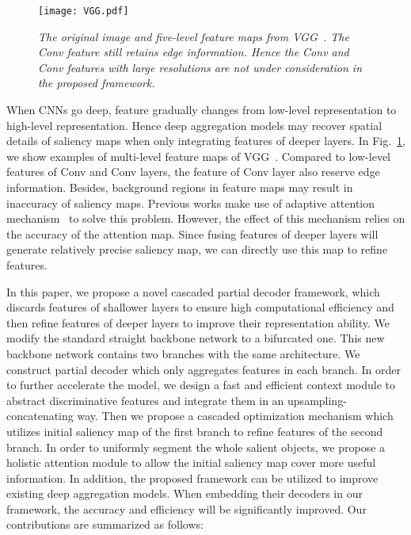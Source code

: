 \documentclass[10pt,twocolumn,letterpaper]{article}
\begin{document}
\begin{figure}
  \centering
  \texttt{[image: VGG.pdf]}\\
  \caption{\emph{The original image and five-level feature maps from VGG~\cite{2014VGG}. The Conv feature still retains edge information. Hence the Conv and Conv features with large resolutions are not under consideration in the proposed framework.}}
  \label{VGGFeatures}
\end{figure}

When CNNs go deep, feature gradually changes from low-level representation to high-level representation. Hence deep aggregation models may recover spatial details of saliency maps when only integrating features of deeper layers. In Fig.~\ref{VGGFeatures}, we show examples of multi-level feature maps of VGG~\cite{2014VGG}. Compared to low-level features of Conv and Conv layers, the feature of Conv layer also reserve edge information. Besides, background regions in feature maps may result in inaccuracy of saliency maps. Previous works make use of adaptive attention mechanism~\cite{2018PiCANet,2018BMPM} to solve this problem. However, the effect of this mechanism relies on the accuracy of the attention map. Since fusing features of deeper layers will generate relatively precise saliency map, we can directly use this map to refine features.

In this paper, we propose a novel cascaded partial decoder framework, which discards features of shallower layers to ensure high computational efficiency and then refine features of deeper layers to improve their representation ability. We modify the standard straight backbone network to a bifurcated one. This new backbone network contains two branches with the same architecture. We construct partial decoder which only aggregates features in each branch. In order to further accelerate the model, we design a fast and efficient context module to abstract discriminative features and integrate them in an upsampling-concatenating way. Then we propose a cascaded optimization mechanism which utilizes initial saliency map of the first branch to refine features of the second branch. In order to uniformly segment the whole salient objects, we propose a holistic attention module to allow the initial saliency map cover more useful information. In addition, the proposed framework can be utilized to improve existing deep aggregation models. When embedding their decoders in our framework, the accuracy and efficiency will be significantly improved. Our contributions are summarized as follows:
\end{document}
